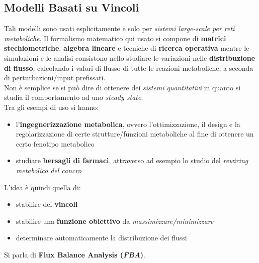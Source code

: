 \documentclass[a4paper,12pt, oneside]{book}
\begin{document}
\subsection{Modelli Basati su Vincoli}
Tali modelli sono usati esplicitamente e solo per \textit{sistemi large-scale
  per reti metaboliche}. Il formalismo matematico qui usato si compone di
\textbf{matrici stechiometriche}, \textbf{algebra lineare} e tecniche di
\textbf{ricerca operativa} mentre le
simulazioni e le analisi consistono nello studiare le variazioni nelle
\textbf{distribuzione di flusso}, calcolando i valori di flusso di tutte le
reazioni metaboliche, a seconda di perturbazioni/input prefissati.\\
Non è semplice se si può dire di ottenere dei \textit{sistemi quantitativi} in
quanto si studia il comportamento ad uno \textit{steady state}.\\
Tra gli esempi di uso si hanno:
\begin{itemize}
  \item l'\textbf{ingegnerizzazione metabolica}, ovvero l'ottimizzazione, il
  design e la regolarizzazione di certe strutture/funzioni metaboliche al fine
  di ottenere un certo fenotipo metabolico
  \item studiare \textbf{bersagli di farmaci}, attraverso ad esempio lo studio
  del \textit{rewiring metabolico del cancro}
\end{itemize}
L'idea è quindi quella di:
\begin{itemize}
  \item stabilire dei \textbf{vincoli}
  \item stabilire una \textbf{funzione obiettivo} da
  \textit{massimizzare/minimizzare}
  \item determinare automaticamente la distribuzione dei flussi
\end{itemize}
Si parla di \textbf{Flux Balance Analysis (\textit{FBA})}.
\end{document}
